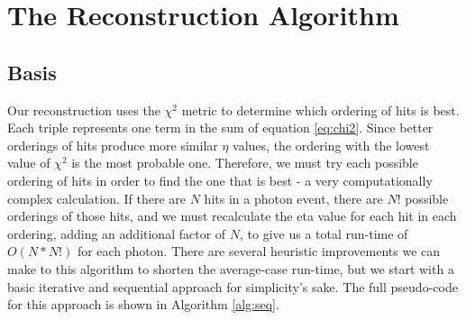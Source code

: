 \chapter{The Reconstruction Algorithm}

\section{Basis}

Our reconstruction uses the $\chi^2$ metric to determine which ordering of hits is best. Each triple represents one term in the sum of equation \ref{eq:chi2}. Since better orderings of hits produce more similar $\eta$ values, the ordering with the lowest value of $\chi^2$ is the most probable one. Therefore, we must try each possible ordering of hits in order to find the one that is best - a very computationally complex calculation. If there are $N$ hits in a photon event, there are $N!$ possible orderings of those hits, and we must recalculate the eta value for each hit in each ordering, adding an additional factor of $N$, to give us a total run-time of $O(N*N!)$ for each photon. There are several heuristic improvements we can make to this algorithm to shorten the average-case run-time, but we start with a basic iterative and sequential approach for simplicity's sake. The full pseudo-code for this approach is shown in Algorithm \ref{alg:seq}.

